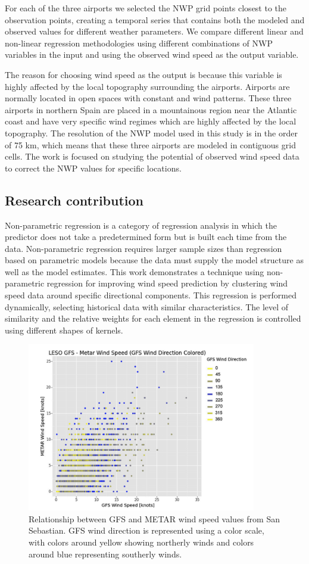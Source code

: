 For each of the three airports we selected the NWP grid points closest to the observation points, creating a temporal series that contains both the modeled and observed values for different weather parameters. We compare different linear and non-linear regression methodologies using different combinations of NWP variables in the input and using the observed wind speed as the output variable.

The reason for choosing wind speed as the output is because this variable is highly affected by the local topography surrounding the airports. Airports are normally located in open spaces with constant and wind patterns. These three airports in northern Spain are placed in a mountainous region near the Atlantic coast and have very specific wind regimes which are highly affected by the local topography. The resolution of the NWP model used in this study is in the order of 75 km, which means that these three airports are modeled in contiguous grid cells. The work is focused on studying the potential of observed wind speed data to correct the NWP values for specific locations.

\subsection{Research contribution}

Non-parametric regression is a category of regression analysis in which the predictor does not take a predetermined form but is built each time from the data. Non-parametric regression requires larger sample sizes than regression based on parametric models because the data must supply the model structure as well as the model estimates. This work demonstrates a technique using non-parametric regression for improving wind speed prediction by clustering wind speed data around specific directional components. This regression is performed dynamically, selecting historical data with similar characteristics. The level of similarity and the relative weights for each element in the regression is controlled using different shapes of kernels.

\begin{figure}[h]
 \centerline{\includegraphics[width=10cm]{paper1.png}}\caption{Relationship between GFS and METAR wind speed values from San Sebastian. GFS wind direction is represented using a color scale, with colors around yellow showing northerly winds and colors around blue representing southerly winds.}\label{paper1}
\end{figure}

